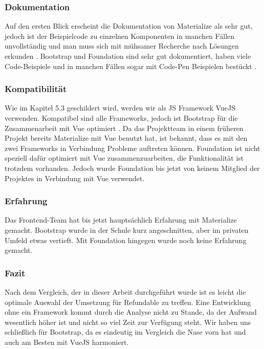 \subsubsection{Dokumentation}
Auf den ersten Blick erscheint die Dokumentation von Materialize als sehr gut, jedoch ist der Beispielcode zu einzelnen Komponenten in manchen Fällen unvollständig und man muss sich mit mühsamer Recherche nach Lösungen erkunden \cite{materialize-docu}. Bootstrap und Foundation sind sehr gut dokumentiert, haben viele Code-Beispiele und in manchen Fällen sogar mit Code-Pen Beispielen bestückt \cite{bootstrap-docu, foundation-docu}.

\subsubsection{Kompatibilität}
Wie im Kapitel 5.3 geschildert wird, werden wir als JS Framework VueJS verwenden. Kompatibel sind alle Frameworks, jedoch ist Bootstrap für die Zusammenarbeit mit Vue optimiert \cite{bootstrap-docu}. Da das Projektteam in einem früheren Projekt bereits Materialize mit Vue benutzt hat, ist bekannt, dass es mit den zwei Frameworks in Verbindung Probleme auftreten können. Foundation ist nicht speziell dafür optimiert mit Vue zusammenzuarbeiten, die Funktionalität ist trotzdem vorhanden. Jedoch wurde Foundation bis jetzt von keinem Mitglied der Projektes in Verbindung mit Vue verwendet.

\subsubsection{Erfahrung}
Das Frontend-Team hat bis jetzt hauptsächlich Erfahrung mit Materialize gemacht. Bootstrap wurde in der Schule kurz angeschnitten, aber im privaten Umfeld etwas vertieft. Mit Foundation hingegen wurde noch keine Erfahrung gemacht.

\subsubsection{Fazit}
Nach dem Vergleich, der in dieser Arbeit durchgeführt wurde ist es leicht die optimale Auswahl der Umsetzung für Refundable zu treffen. Eine Entwicklung ohne ein Framework kommt durch die Analyse nicht zu Stande, da der Aufwand wesentlich höher ist und nicht so viel Zeit zur Verfügung steht. Wir haben uns schließlich für Bootstrap, da es eindeutig im Vergleich die Nase vorn hat und auch am Besten mit VueJS harmoniert.


